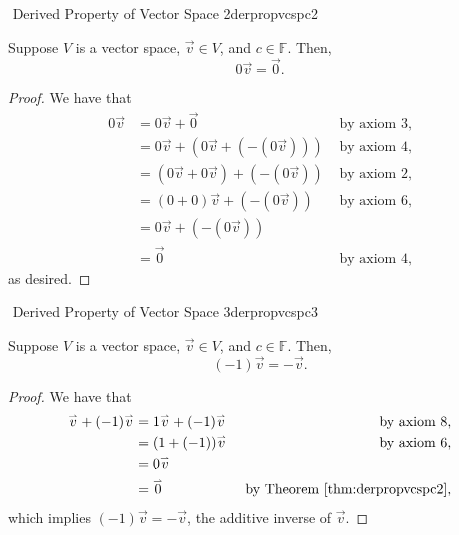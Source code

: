         \begin{theorem}{\Stop\,\,Derived Property of Vector Space 2}{derpropvcspc2}

            Suppose \(V\) is a vector space, \(\vec{v}\in V\), and \(c\in\mathbb{F}\). Then,
            \begin{equation*}
                0\vec{v}=\vec{0}.
            \end{equation*}
            \begin{proof}
                We have that
                \begin{align*}
                    0\vec{v}&=0\vec{v}+\vec{0} &\text{ by axiom \(3\),} \\
                    &=0\vec{v}+(0\vec{v}+(-(0\vec{v}))) &\text{ by axiom \(4\),} \\
                    &=(0\vec{v}+0\vec{v})+(-(0\vec{v})) &\text{ by axiom \(2\),} \\
                    &=(0+0)\vec{v}+(-(0\vec{v})) &\text{ by axiom \(6\),} \\
                    &=0\vec{v}+(-(0\vec{v})) \\
                    &=\vec{0} &\text{ by axiom \(4\),}
                \end{align*}
                as desired.
            \end{proof}
        \end{theorem}
        \pagebreak
        \begin{theorem}{\Stop\,\,Derived Property of Vector Space 3}{derpropvcspc3}

            Suppose \(V\) is a vector space, \(\vec{v}\in V\), and \(c\in\mathbb{F}\). Then,
            \begin{equation*}
                (-1)\vec{v}=-\vec{v}.
            \end{equation*}
            \begin{proof}
                We have that
                \begin{align*}
                    \vec{v}+(-1)\vec{v}&=1\vec{v}+(-1)\vec{v} &\text{ by axiom \(8\),} \\
                    &=(1+(-1))\vec{v} &\text{ by axiom \(6\),} \\
                    &=0\vec{v} \\
                    &=\vec{0} &\text{ by Theorem \ref{thm:derpropvcspc2},}
                \end{align*}
                which implies \((-1)\vec{v}=-\vec{v}\), the additive inverse of \(\vec{v}\).
            \end{proof}
        \end{theorem}
